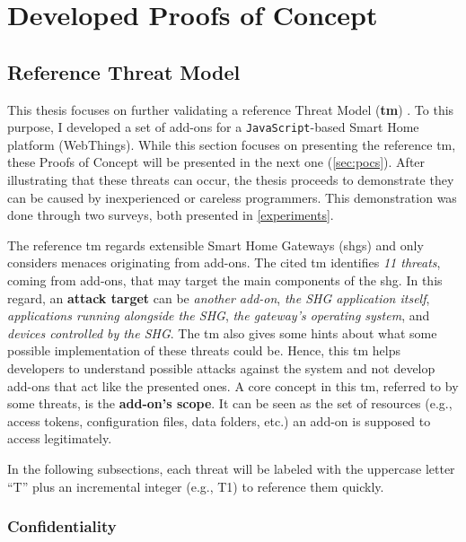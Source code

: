 \chapter{Developed Proofs of Concept}
\label{pocs}
 
\section{Reference Threat Model}
\label{sec:ref_tm}

This thesis focuses on further validating a reference Threat Model (\textbf{\gls{tm}}) \cite{corno2022threat}. To this purpose, I developed a set of add-ons for a \texttt{JavaScript}-based Smart Home platform (WebThings). While this section focuses on presenting the reference \gls{tm}, these Proofs of Concept will be presented in the next one (\autoref{sec:pocs}). After illustrating that these threats can occur, the thesis proceeds to demonstrate they can be caused by inexperienced or careless programmers. This demonstration was done through two surveys, both presented in \autoref{experiments}.


The reference \gls{tm} regards extensible Smart Home Gateways (\glspl{shg}) and only considers menaces originating from add-ons. The cited \gls{tm} identifies \textit{11 threats}, coming from add-ons, that may target the main components of the \gls{shg}. In this regard, an \textbf{attack target} can be \textit{another add-on}, \textit{the SHG application itself}, \textit{applications running alongside the SHG}, \textit{the gateway's operating system}, and \textit{devices controlled by the SHG}. The \gls{tm} also gives some hints about what some possible implementation of these threats could be. Hence, this \gls{tm} helps developers to understand possible attacks against the system and not develop add-ons that act like the presented ones. A core concept in this \gls{tm}, referred to by some threats, is the \textbf{add-on's scope}. It can be seen as the set of resources (e.g., access tokens, configuration files, data folders, etc.) an add-on is supposed to access legitimately.


 In the following subsections, each threat will be labeled with the uppercase letter ``T'' plus an incremental integer (e.g., T1) to reference them quickly.

\subsection{Confidentiality}
\label{t1}\label{t2}


